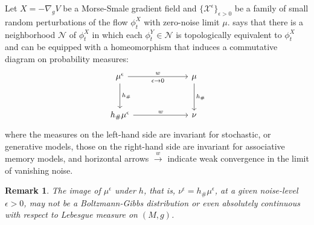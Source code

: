 \documentclass[12pt]{article}
\newtheorem{remark}[theorem]{Remark}
\begin{document}
Let $X = -\nabla_g V$ be a Morse-Smale gradient field and $\{ \mathcal{X}^{\epsilon}\}_{\epsilon > 0}$ be a family of small random perturbations of the flow $\phi_t^X$ with zero-noise limit $\mu$.  says that there is a neighborhood $\mathcal{N}$ of $\phi_t^X$ in which each $\phi_t^Y \in \mathcal{N}$ is topologically equivalent to $\phi_t^X$ and can be equipped with a homeomorphism that induces a commutative diagram on probability measures:
\begin{equation*}
    \begin{tikzcd}[column sep=6.5em, row sep=3.em]
    \mu^{\epsilon} \arrow[r, "w", "\epsilon \rightarrow 0" swap] \arrow[d, "h_{\#}"]
    & \mu \arrow[d, "h_{\#}"]  \\
    h_{\#}\mu^{\epsilon}  \arrow[r, "w"]
    & \nu
    \end{tikzcd} 
\end{equation*}
where the measures on the left-hand side are invariant for stochastic, or generative models, those on the right-hand side are invariant for associative memory models, and horizontal arrows $\xrightarrow{w}$ indicate weak convergence in the limit of vanishing noise.

\begin{remark}
    The image of $\mu^{\epsilon}$ under $h$, that is, $\nu^{\epsilon} = h_{\#}\mu^{\epsilon}$, at a given noise-level $\epsilon>0$, may not be a Boltzmann-Gibbs distribution or even absolutely continuous with respect to Lebesgue measure on $(M,g)$.
\end{remark}

\end{document}
